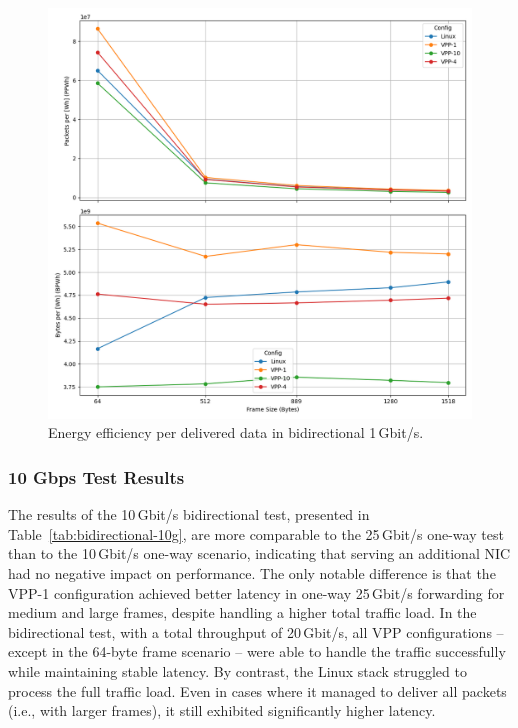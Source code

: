 \begin{figure}[!htbp]
    \centering
    \includegraphics[width=\linewidth]{images/consumption-bi-1g.png}
    \caption{Energy efficiency per delivered data in bidirectional 1\,Gbit/s.}
    \label{fig:bi-1g}
\end{figure}

\subsubsection{10 Gbps Test Results}

The results of the 10\,Gbit/s bidirectional test, presented in Table~\ref{tab:bidirectional-10g}, are more comparable to the 25\,Gbit/s one-way test than to the 10\,Gbit/s one-way scenario, 
indicating that serving an additional NIC had no negative impact on performance.  
The only notable difference is that the VPP-1 configuration achieved better latency in one-way 25\,Gbit/s forwarding for medium and large frames, despite handling a higher total traffic load.  
In the bidirectional test, with a total throughput of 20\,Gbit/s, all VPP configurations -- except in the 64-byte frame scenario -- 
were able to handle the traffic successfully while maintaining stable latency.  
By contrast, the Linux stack struggled to process the full traffic load. Even in cases where it managed to deliver all packets (i.e., with larger frames), it still exhibited significantly higher latency.


